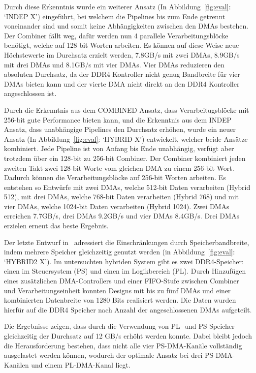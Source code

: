 \documentclass[conference]{IEEEtran}
\begin{document}
Durch diese Erkenntnis wurde ein weiterer Ansatz (In Abbildung~\ref{fig:eval}: `INDEP X') eingeführt, bei welchem die Pipelines bis zum Ende getrennt voneinander sind und
somit keine Abhängigkeiten zwischen den DMAs bestehen. Der Combiner fällt weg, dafür werden nun 4 parallele Verarbeitungsblöcke benötigt, welche auf 128-bit Worten
arbeiten. Es können auf diese Weise neue Höchstewerte im Durchsatz erzielt werden,
7.8GB/s mit zwei DMAs, 8.9GB/s mit drei DMAs und 8.1GB/s mit vier DMAs. Vier DMAs reduzieren den absoluten Durchsatz, da der DDR4 Kontroller
nicht genug Bandbreite für vier DMAs bieten kann und der
vierte DMA nicht direkt an den DDR4 Kontroller angeschlossen ist.

Durch die Erkenntnis aus dem COMBINED Ansatz, dass Verarbeitugsblöcke mit 256-bit gute Performance bieten kann, und die Erkenntnis aus dem INDEP Ansatz, dass
unabhängige Pipelines den Durchsatz erhöhen, wurde ein neuer Ansatz (In Abbildung~\ref{fig:eval}: `HYBRID X') entwickelt, welcher beide Ansätze kombiniert.
Jede Pipeline ist von Anfang bis Ende unabhängig, verfügt aber trotzdem über ein 128-bit zu 256-bit Combiner. Der Combiner kombiniert jeden zweiten Takt zwei 128-bit Worte
vom gleichen DMA zu einem 256-bit Wort. Dadurch können die Verarbeitungsblöcke auf 256-bit Worten arbeiten. Es entstehen so Entwürfe mit zwei DMAs, welche 512-bit Daten verarbeiten
(Hybrid 512), mit drei DMAs, welche 768-bit Daten verarbeiten (Hybrid 768) und mit vier DMAs, welche 1024-bit Daten verarbeiten (Hybrid 1024). Zwei DMAs erreichen 7.7GB/s, drei DMAs 9.2GB/s
und vier DMAs 8.4GB/s. Drei DMAs erzielen erneut das beste Ergebnis.


Der letzte Entwurf in~\cite{lisa_column_2018} adressiert die Einschränkungen durch Speicherbandbreite, indem mehrere Speicher gleichzeitig genutzt werden
(in Abbildung~\ref{fig:eval}: `HYBRID2 X').
Im untersuchten hybriden System gibt es zwei DDR4-Speicher: einen im Steuersystem (PS) und einen im Logikbereich (PL). Durch Hinzufügen eines zusätzlichen DMA-Controllers
und einer FIFO-Stufe zwischen Combiner und Verarbeitungseinheit konnten Designs mit bis zu fünf DMAs und einer kombinierten Datenbreite von 1280 Bits realisiert werden.
Die Daten wurden hierfür auf die DDR4 Speicher nach Anzahl der angeschlossenen DMAs aufgeteilt.

Die Ergebnisse zeigen, dass durch die Verwendung von PL- und PS-Speicher gleichzeitig der Durchsatz auf 12 GB/s erhöht werden konnte. Dabei bleibt jedoch die Herausforderung bestehen,
dass nicht alle vier PS-DMA-Kanäle vollständig ausgelastet werden können, wodurch der optimale Ansatz bei drei PS-DMA-Kanälen und einem PL-DMA-Kanal liegt.
\end{document}
